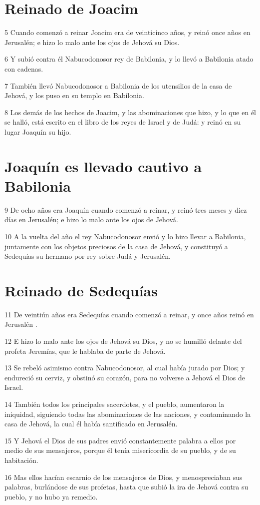 \section*{Reinado de Joacim}

\par 5 Cuando comenzó a reinar Joacim era de veinticinco años, y reinó once años en Jerusalén; e hizo lo malo ante los ojos de Jehová su Dios.
\par 6 Y subió contra él Nabucodonosor rey de Babilonia, y lo llevó a Babilonia atado con cadenas.
\par 7 También llevó Nabucodonosor a Babilonia de los utensilios de la casa de Jehová, y los puso en su templo en Babilonia.
\par 8 Los demás de los hechos de Joacim, y las abominaciones que hizo, y lo que en él se halló, está escrito en el libro de los reyes de Israel y de Judá: y reinó en su lugar Joaquín su hijo.

\section*{Joaquín es llevado cautivo a Babilonia}

\par 9 De ocho años era Joaquín cuando comenzó a reinar, y reinó tres meses y diez días en Jerusalén; e hizo lo malo ante los ojos de Jehová.
\par 10 A la vuelta del año el rey Nabucodonosor envió y lo hizo llevar a Babilonia, juntamente con los objetos preciosos de la casa de Jehová, y constituyó a Sedequías su hermano por rey sobre Judá y Jerusalén. 

\section*{Reinado de Sedequías}

\par 11 De veintiún años era Sedequías cuando comenzó a reinar, y once años reinó en Jerusalén .
\par 12 E hizo lo malo ante los ojos de Jehová su Dios, y no se humilló delante del profeta Jeremías, que le hablaba de parte de Jehová.
\par 13 Se rebeló asimismo contra Nabucodonosor, al cual había jurado por Dios; y endureció su cerviz, y obstinó su corazón, para no volverse a Jehová el Dios de Israel.
\par 14 También todos los principales sacerdotes, y el pueblo, aumentaron la iniquidad, siguiendo todas las abominaciones de las naciones, y contaminando la casa de Jehová, la cual él había santificado en Jerusalén. 
\par 15 Y Jehová el Dios de sus padres envió constantemente palabra a ellos por medio de sus mensajeros, porque él tenía misericordia de su pueblo, y de su habitación.
\par 16 Mas ellos hacían escarnio de los mensajeros de Dios, y menospreciaban sus palabras, burlándose de sus profetas, hasta que subió la ira de Jehová contra su pueblo, y no hubo ya remedio.


